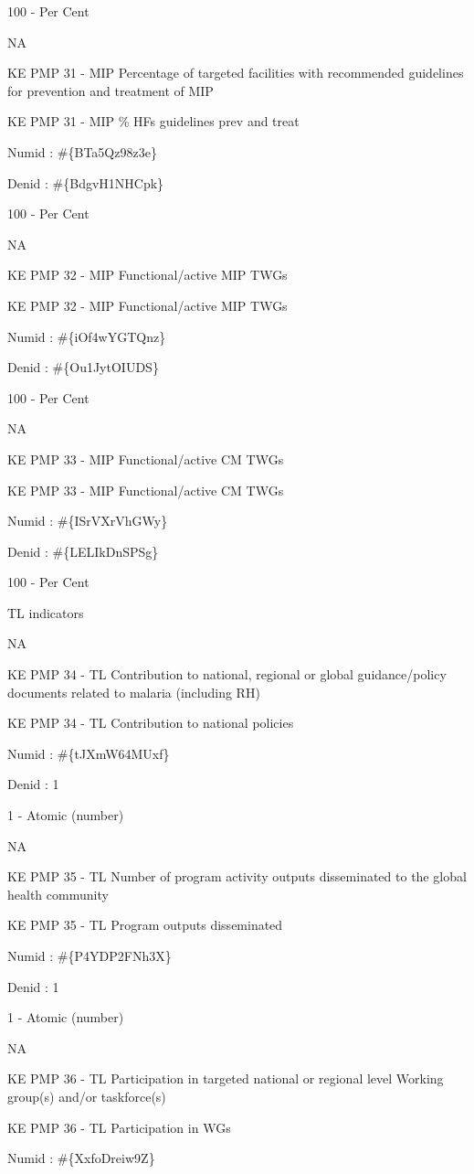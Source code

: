\documentclass[]{book}
\begin{document}
100 - Per Cent

NA

KE PMP 31 - MIP Percentage of targeted facilities with recommended guidelines for prevention and treatment of MIP

KE PMP 31 - MIP \% HFs guidelines prev and treat

Numid : \#\{BTa5Qz98z3e\}

Denid : \#\{BdgvH1NHCpk\}

100 - Per Cent

NA

KE PMP 32 - MIP Functional/active MIP TWGs

KE PMP 32 - MIP Functional/active MIP TWGs

Numid : \#\{iOf4wYGTQnz\}

Denid : \#\{Ou1JytOIUDS\}

100 - Per Cent

NA

KE PMP 33 - MIP Functional/active CM TWGs

KE PMP 33 - MIP Functional/active CM TWGs

Numid : \#\{ISrVXrVhGWy\}

Denid : \#\{LELIkDnSPSg\}

100 - Per Cent

TL indicators

NA

KE PMP 34 - TL Contribution to national, regional or global guidance/policy documents related to malaria (including RH)

KE PMP 34 - TL Contribution to national policies

Numid : \#\{tJXmW64MUxf\}

Denid : 1

1 - Atomic (number)

NA

KE PMP 35 - TL Number of program activity outputs disseminated to the global health community

KE PMP 35 - TL Program outputs disseminated

Numid : \#\{P4YDP2FNh3X\}

Denid : 1

1 - Atomic (number)

NA

KE PMP 36 - TL Participation in targeted national or regional level Working group(s) and/or taskforce(s)

KE PMP 36 - TL Participation in WGs

Numid : \#\{XxfoDreiw9Z\}
\end{document}
